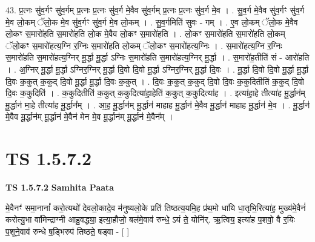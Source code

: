 \documentclass[17pt]{extarticle}
\begin{document}
43. प्र॒त्नः सु॑व॒र्गꣳ सु॑व॒र्गम् प्र॒त्नः प्र॒त्नः सु॑व॒र्ग मे॒वैव सु॑व॒र्गम् प्र॒त्नः प्र॒त्नः सु॑व॒र्ग मे॒व । . सु॒व॒र्ग मे॒वैव सु॑व॒र्गꣳ सु॑व॒र्ग मे॒व लो॒कम् ॅलो॒क मे॒व सु॑व॒र्गꣳ सु॑व॒र्ग मे॒व लो॒कम् । . सु॒व॒र्गमिति॑ सुवः - गम् । . ए॒व लो॒कम् ॅलो॒क मे॒वैव लो॒कꣳ स॒मारो॑हति स॒मारो॑हति लो॒क मे॒वैव लो॒कꣳ स॒मारो॑हति । . लो॒कꣳ स॒मारो॑हति स॒मारो॑हति लो॒कम् ॅलो॒कꣳ स॒मारो॑हत्य॒ग्नि र॒ग्निः स॒मारो॑हति लो॒कम् ॅलो॒कꣳ स॒मारो॑हत्य॒ग्निः । . स॒मारो॑हत्य॒ग्नि र॒ग्निः स॒मारो॑हति स॒मारो॑हत्य॒ग्निर् मू॒र्द्धा मू॒र्द्धा ऽग्निः स॒मारो॑हति स॒मारो॑हत्य॒ग्निर् मू॒र्द्धा । . स॒मारो॑ह॒तीति॑ सं - आरो॑हति । . अ॒ग्निर् मू॒र्द्धा मू॒र्द्धा ऽग्निर॒ग्निर् मू॒र्द्धा दि॒वो दि॒वो मू॒र्द्धा ऽग्निर॒ग्निर् मू॒र्द्धा दि॒वः । . मू॒र्द्धा दि॒वो दि॒वो मू॒र्द्धा मू॒र्द्धा दि॒वः क॒कुत् क॒कुद् दि॒वो मू॒र्द्धा मू॒र्द्धा दि॒वः क॒कुत् । . दि॒वः क॒कुत् क॒कुद् दि॒वो दि॒वः क॒कुदितीति॑ क॒कुद् दि॒वो दि॒वः क॒कुदिति॑ । . क॒कुदितीति॑ क॒कुत् क॒कुदित्या॑हा॒हेति॑ क॒कुत् क॒कुदित्या॑ह । . इत्या॑हा॒हे तीत्या॑ह मू॒र्द्धान॑म् मू॒र्द्धान॑ मा॒हे तीत्या॑ह मू॒र्द्धान᳚म् । . आ॒ह॒ मू॒र्द्धान॑म् मू॒र्द्धान॑ माहाह मू॒र्द्धान॑ मे॒वैव मू॒र्द्धान॑ माहाह मू॒र्द्धान॑ मे॒व । . मू॒र्द्धान॑ मे॒वैव मू॒र्द्धान॑म् मू॒र्द्धान॑ मे॒वैन॑ मेन मे॒व मू॒र्द्धान॑म् मू॒र्द्धान॑ मे॒वैन᳚म् । \newline
\pagebreak
{}
\section*{ TS 1.5.7.2 }

\textbf{TS 1.5.7.2 } \newline
\textbf{Samhita Paata} \newline

मे॒वैनꣳ॑ समा॒नानां᳚ करो॒त्यथो॑ देवलो॒कादे॒व म॑नुष्यलो॒के प्रति॑ तिष्ठत्य॒यमि॒ह प्र॑थ॒मो धा॑यि धा॒तृभि॒रित्या॑ह॒ मुख्य॑मे॒वैनं॑ करोत्यु॒भा वा॑मिन्द्राग्नी आहु॒वद्ध्या॒ इत्या॒हौजो॒ बल॑मे॒वाव॑ रुन्धे॒ ऽयं ते॒ योनि॑र्. ऋ॒त्विय॒ इत्या॑ह प॒शवो॒ वै र॒यिः प॒शूने॒वाव॑ रुन्धे ष॒ड्भिरुप॑ तिष्ठते॒ षड्वा - [ ] \newline
\end{document}
